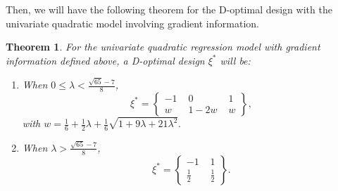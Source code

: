 \documentclass[preprint,12pt]{elsarticle}
\newtheorem{thm}{Theorem}
\begin{document}
Then, we will have the following theorem for the D-optimal design
with the univariate quadratic model involving gradient information.
\begin{thm}
For the univariate quadratic regression model with gradient
information defined above, a D-optimal design $\xi^*$ will be:

\begin{enumerate}
\item When $0\leq\lambda<\frac{\sqrt{65}-7}{8}$, $$\xi^*=\left\{\begin{array}{ccc}-1\,\,&0\,\,&1\\w\,\,&1-2w\,\,&w\end{array}\right\},$$
with
$w=\frac{1}{6}+\frac{1}{2}\lambda+\frac{1}{6}\sqrt{1+9\lambda+21\lambda^2}.$
\item When $\lambda>\frac{\sqrt{65}-7}{8}$, $$\xi^*=\left\{\begin{array}{ccc}-1\,\,&1\\ \frac{1}{2}\,\,&\frac{1}{2}\end{array}\right\}.$$
\end{enumerate}

\end{thm}
\end{document}
